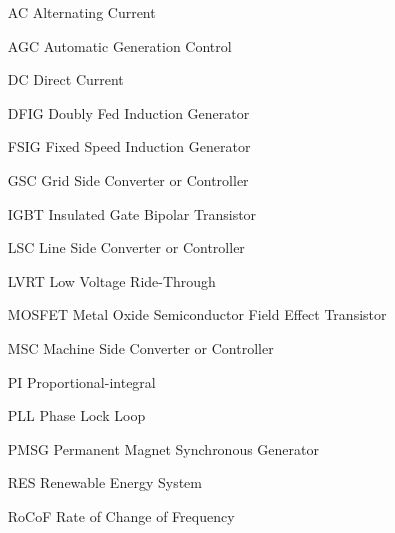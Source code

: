 \begin{glossary}{}

\begin{itemize}[leftmargin=4.5em,align=parleft,labelsep=1cm]
	
\item[AC] Alternating Current
\item[AGC] Automatic Generation Control
\item[DC] Direct Current
\item[DFIG] Doubly Fed Induction Generator
\item[FSIG] Fixed Speed Induction Generator
\item[GSC] Grid Side Converter or Controller
\item[IGBT] Insulated Gate Bipolar Transistor
\item[LSC] Line Side Converter or Controller
\item[LVRT] Low Voltage Ride-Through
\item[MOSFET] Metal Oxide Semiconductor Field Effect Transistor
\item[MSC] Machine Side Converter or Controller
\item[PI] Proportional-integral
\item[PLL] Phase Lock Loop
\item[PMSG] Permanent Magnet Synchronous Generator
\item[RES] Renewable Energy System
\item[RoCoF] Rate of Change of Frequency

\end{itemize}

\end{glossary}
